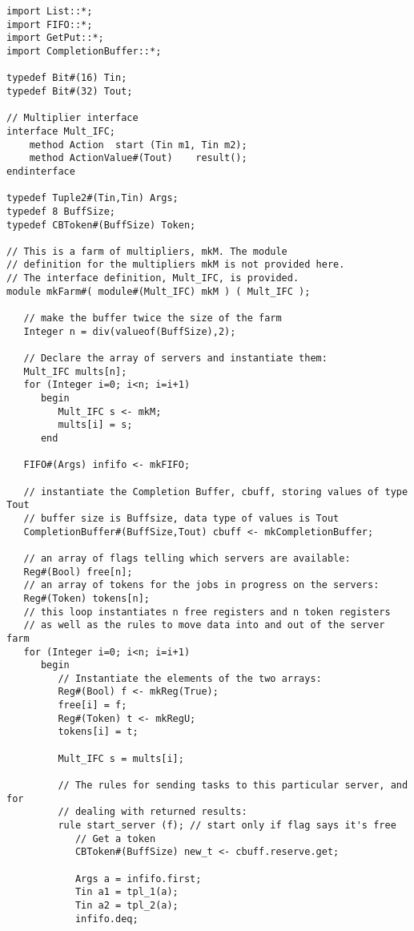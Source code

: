 \begin{verbatim}
import List::*;
import FIFO::*;
import GetPut::*;
import CompletionBuffer::*;

typedef Bit#(16) Tin;
typedef Bit#(32) Tout;

// Multiplier interface
interface Mult_IFC;
    method Action  start (Tin m1, Tin m2);
    method ActionValue#(Tout)    result();
endinterface

typedef Tuple2#(Tin,Tin) Args;
typedef 8 BuffSize;
typedef CBToken#(BuffSize) Token;

// This is a farm of multipliers, mkM. The module
// definition for the multipliers mkM is not provided here.  
// The interface definition, Mult_IFC, is provided.
module mkFarm#( module#(Mult_IFC) mkM ) ( Mult_IFC );

   // make the buffer twice the size of the farm
   Integer n = div(valueof(BuffSize),2); 
                                     
   // Declare the array of servers and instantiate them:
   Mult_IFC mults[n];
   for (Integer i=0; i<n; i=i+1)
      begin
         Mult_IFC s <- mkM;
         mults[i] = s;
      end

   FIFO#(Args) infifo <- mkFIFO;
 
   // instantiate the Completion Buffer, cbuff, storing values of type Tout
   // buffer size is Buffsize, data type of values is Tout
   CompletionBuffer#(BuffSize,Tout) cbuff <- mkCompletionBuffer;

   // an array of flags telling which servers are available:
   Reg#(Bool) free[n];
   // an array of tokens for the jobs in progress on the servers:
   Reg#(Token) tokens[n];
   // this loop instantiates n free registers and n token registers
   // as well as the rules to move data into and out of the server farm
   for (Integer i=0; i<n; i=i+1)
      begin
         // Instantiate the elements of the two arrays:
         Reg#(Bool) f <- mkReg(True);
         free[i] = f;
         Reg#(Token) t <- mkRegU;
         tokens[i] = t;

         Mult_IFC s = mults[i];

         // The rules for sending tasks to this particular server, and for
         // dealing with returned results:
         rule start_server (f); // start only if flag says it's free
            // Get a token
            CBToken#(BuffSize) new_t <- cbuff.reserve.get;
                       
            Args a = infifo.first;
            Tin a1 = tpl_1(a);
            Tin a2 = tpl_2(a);
            infifo.deq;


\end{verbatim}
